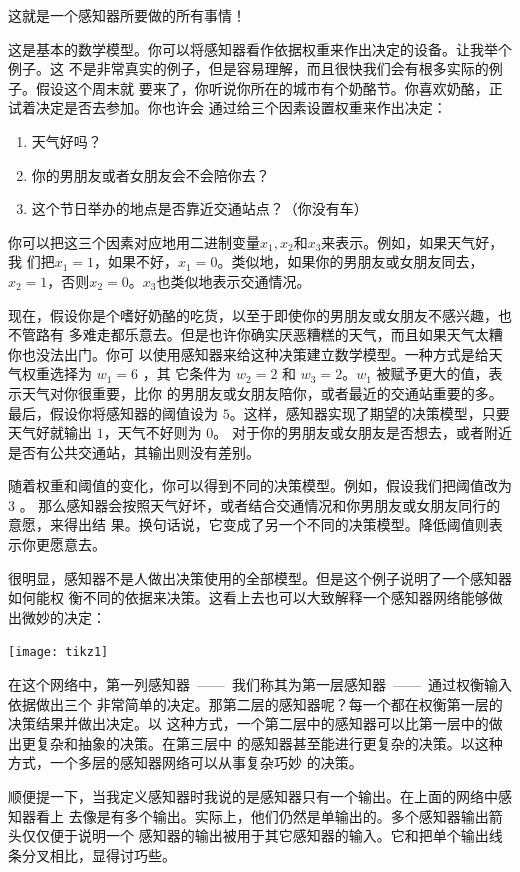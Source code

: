 这就是一个感知器所要做的所有事情！

这是基本的数学模型。你可以将感知器看作依据权重来作出决定的设备。让我举个例子。这
不是非常真实的例子，但是容易理解，而且很快我们会有根多实际的例子。假设这个周末就
要来了，你听说你所在的城市有个奶酪节。你喜欢奶酪，正试着决定是否去参加。你也许会
通过给三个因素设置权重来作出决定：
\begin{enumerate}
\item 天气好吗？
\item 你的男朋友或者女朋友会不会陪你去？
\item 这个节日举办的地点是否靠近交通站点？（你没有车）
\end{enumerate}

你可以把这三个因素对应地用二进制变量$x_1,x_2$和$x_3$来表示。例如，如果天气好，我
们把$x_1 = 1$，如果不好，$x_1 = 0$。类似地，如果你的男朋友或女朋友同去，$x_2 =
1$，否则$x_2 = 0$。$x_3$也类似地表示交通情况。

现在，假设你是个嗜好奶酪的吃货，以至于即使你的男朋友或女朋友不感兴趣，也不管路有
多难走都乐意去。但是也许你确实厌恶糟糕的天气，而且如果天气太糟你也没法出门。你可
以使用感知器来给这种决策建立数学模型。一种方式是给天气权重选择为 $w_1 = 6$ ，其
它条件为 $w_2 = 2$ 和 $w_3 = 2$。$w_1$ 被赋予更大的值，表示天气对你很重要，比你
的男朋友或女朋友陪你，或者最近的交通站重要的多。最后，假设你将感知器的阈值设为
$5$。这样，感知器实现了期望的决策模型，只要天气好就输出 $1$，天气不好则为 $0$。
对于你的男朋友或女朋友是否想去，或者附近是否有公共交通站，其输出则没有差别。

随着权重和阈值的变化，你可以得到不同的决策模型。例如，假设我们把阈值改为 $3$ 。
那么感知器会按照天气好坏，或者结合交通情况和你男朋友或女朋友同行的意愿，来得出结
果。换句话说，它变成了另一个不同的决策模型。降低阈值则表示你更愿意去。

很明显，感知器不是人做出决策使用的全部模型。但是这个例子说明了一个感知器如何能权
衡不同的依据来决策。这看上去也可以大致解释一个感知器网络能够做出微妙的决定：
\begin{center}
  \texttt{[image: tikz1]}
\end{center}

在这个网络中，第一列感知器~——~我们称其为第一层感知器~——~通过权衡输入依据做出三个
非常简单的决定。那第二层的感知器呢？每一个都在权衡第一层的决策结果并做出决定。以
这种方式，一个第二层中的感知器可以比第一层中的做出更复杂和抽象的决策。在第三层中
的感知器甚至能进行更复杂的决策。以这种方式，一个多层的感知器网络可以从事复杂巧妙
的决策。

顺便提一下，当我定义感知器时我说的是感知器只有一个输出。在上面的网络中感知器看上
去像是有多个输出。实际上，他们仍然是单输出的。多个感知器输出箭头仅仅便于说明一个
感知器的输出被用于其它感知器的输入。它和把单个输出线条分叉相比，显得讨巧些。

